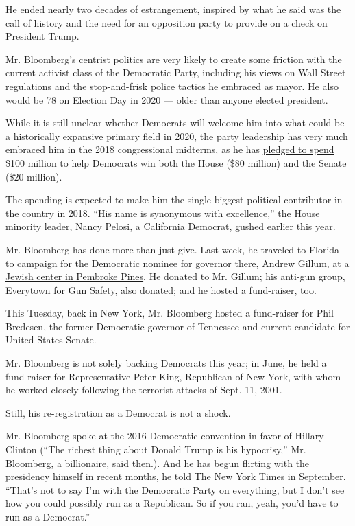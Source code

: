 He ended nearly two decades of estrangement, inspired by what he said
was the call of history and the need for an opposition party to provide
on a check on President Trump.

Mr. Bloomberg's centrist politics are very likely to create some
friction with the current activist class of the Democratic Party,
including his views on Wall Street regulations and the stop-and-frisk
police tactics he embraced as mayor. He also would be 78 on Election Day
in 2020 --- older than anyone elected president.

While it is still unclear whether Democrats will welcome him into what
could be a historically expansive primary field in 2020, the party
leadership has very much embraced him in the 2018 congressional
midterms, as he has
\href{https://www.nytimes3xbfgragh.onion/2018/06/20/us/politics/mike-bloomberg-democrats-election.html}{pledged
to spend} \$100 million to help Democrats win both the House (\$80
million) and the Senate (\$20 million).

The spending is expected to make him the single biggest political
contributor in the country in 2018. ``His name is synonymous with
excellence,'' the House minority leader, Nancy Pelosi, a California
Democrat, gushed earlier this year.

Mr. Bloomberg has done more than just give. Last week, he traveled to
Florida to campaign for the Democratic nominee for governor there,
Andrew Gillum,
\href{http://www.sun-sentinel.com/news/politics/fl-ne-michael-bloomberg-florida-campaign-donald-trump-20181008-story.html}{at
a Jewish center in Pembroke Pines}. He donated to Mr. Gillum; his
anti-gun group, \href{https://everytown.org/}{Everytown for Gun Safety},
also donated; and he hosted a fund-raiser, too.

This Tuesday, back in New York, Mr. Bloomberg hosted a fund-raiser for
Phil Bredesen, the former Democratic governor of Tennessee and current
candidate for United States Senate.

Mr. Bloomberg is not solely backing Democrats this year; in June, he
held a fund-raiser for Representative Peter King, Republican of New
York, with whom he worked closely following the terrorist attacks of
Sept. 11, 2001.

Still, his re-registration as a Democrat is not a shock.

Mr. Bloomberg spoke at the 2016 Democratic convention in favor of
Hillary Clinton (``The richest thing about Donald Trump is his
hypocrisy,'' Mr. Bloomberg, a billionaire, said then.). And he has begun
flirting with the presidency himself in recent months, he told
\href{https://www.nytimes3xbfgragh.onion/2018/09/17/us/politics/bloomberg-president-2020-democrat.html}{The
New York Times} in September. ``That's not to say I'm with the
Democratic Party on everything, but I don't see how you could possibly
run as a Republican. So if you ran, yeah, you'd have to run as a
Democrat.''

